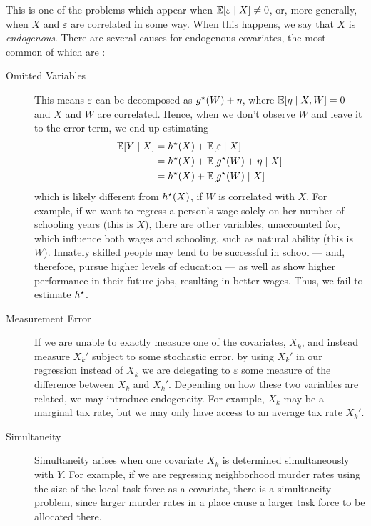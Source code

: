 This is one of the problems which appear when $ \mathbb{E} [ \varepsilon \mid X ] \neq 0 $, or, more generally, when $ X $ and $ \varepsilon $ are correlated in some way.
When this happens, we say that $ X $ is \emph{endogenous}.
There are several causes for endogenous covariates, the most common of  which are \cite{wooldridge2001}:
\begin{description}
    \item[Omitted Variables] This means $ \varepsilon $ can be decomposed as $ g^{ \star } ( W ) + \eta $, where $ \mathbb{E} [ \eta \mid X, W ] = 0 $ and $ X $ and $ W $ are correlated.
        Hence, when we don't observe $ W $ and leave it to the error term, we end up estimating
        \begin{align*}
            \mathbb{E} [ Y \mid X ]
            &= h^{ \star } ( X ) + \mathbb{E} [ \varepsilon \mid X ] \\
            &= h^{ \star } ( X ) + \mathbb{E} [ g^{ \star } ( W ) + \eta \mid X ] \\
            &= h^{ \star } ( X ) + \mathbb{E} [ g^{ \star } ( W ) \mid X ]
        \end{align*}
        which is likely different from $ h^{ \star } ( X ) $, if $ W $ is correlated with $ X $.
        For example, if we want to regress a person's wage solely on her number of schooling years (this is $ X $), there are other variables, unaccounted for, which influence both wages and schooling, such as natural ability (this is $ W $).
        Innately skilled people may tend to be successful in school --- and, therefore, pursue higher levels of education --- as well as show higher performance in their future jobs, resulting in better wages.
        Thus, we fail to estimate $ h^{ \star } $.
    \item[Measurement Error] If we are unable to exactly measure one of the covariates, $ X_{ k } $, and instead measure $ X_{ k }' $ subject to some stochastic error, by using $ X_{ k }' $ in our regression instead of $ X_{ k } $ we are delegating to $ \varepsilon $ some measure of the difference between $ X_{ k } $ and $ X_{ k }' $.
        Depending on how these two variables are related, we may introduce endogeneity.
        For example, $ X_{ k } $ may be a marginal tax rate, but we may only have access to an average tax rate $ X_{ k }' $.
    \item[Simultaneity] Simultaneity arises when one covariate $ X_{ k } $ is determined simultaneously with $ Y $.
        For example, if we are regressing neighborhood murder rates using the size of the local task force as a covariate, there is a simultaneity problem, since larger murder rates in a place cause a larger task force to be allocated there.
\end{description}


